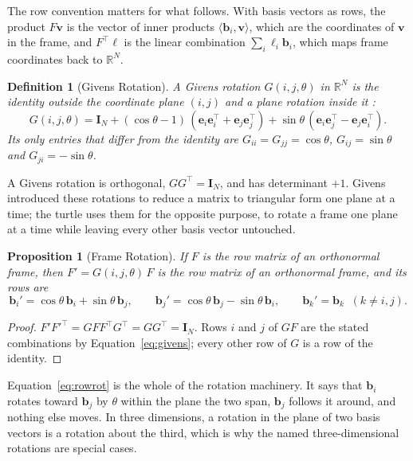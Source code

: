 \documentclass[11pt,letterpaper]{article}
\newtheorem{definition}{Definition}[section]
\newtheorem{proposition}{Proposition}[section]
\newcommand{\R}{\mathbb{R}}
\newcommand{\basis}{\mathbf{b}}
\newcommand{\std}{\mathbf{e}}
\newcommand{\eye}{\mathbf{I}}
\begin{document}
The row convention matters for what follows. With basis vectors as
rows, the product $F \mathbf{v}$ is the vector of inner products
$\langle \basis_i, \mathbf{v} \rangle$, which are the coordinates of
$\mathbf{v}$ in the frame, and $F^\top \bm{\ell}$ is the linear
combination $\sum_i \ell_i \basis_i$, which maps frame coordinates back
to $\R^N$.

\begin{definition}[Givens Rotation]
\label{def:givens}
A \emph{Givens rotation} $G(i, j, \theta)$ in $\R^N$ is the identity
outside the coordinate plane $(i, j)$ and a plane rotation inside it
\citep{givens1958computation, golub2013matrix}:
\begin{equation}
  G(i, j, \theta)
  = \eye_N
  + (\cos\theta - 1)\,(\std_i\std_i^\top + \std_j\std_j^\top)
  + \sin\theta\,(\std_i\std_j^\top - \std_j\std_i^\top).
  \label{eq:givens}
\end{equation}
Its only entries that differ from the identity are
$G_{ii} = G_{jj} = \cos\theta$, $G_{ij} = \sin\theta$ and
$G_{ji} = -\sin\theta$.
\end{definition}

A Givens rotation is orthogonal, $G G^\top = \eye_N$, and has
determinant $+1$. Givens introduced these rotations to reduce a matrix
to triangular form one plane at a time; the turtle uses them for the
opposite purpose, to rotate a frame one plane at a time while leaving
every other basis vector untouched.

\begin{proposition}[Frame Rotation]
\label{prop:rotation}
If $F$ is the row matrix of an orthonormal frame, then $F' = G(i, j,
\theta)\,F$ is the row matrix of an orthonormal frame, and its rows are
\begin{equation}
  \basis_i' = \cos\theta\,\basis_i + \sin\theta\,\basis_j, \qquad
  \basis_j' = \cos\theta\,\basis_j - \sin\theta\,\basis_i, \qquad
  \basis_k' = \basis_k \;\; (k \neq i, j).
  \label{eq:rowrot}
\end{equation}
\end{proposition}

\begin{proof}
$F' F'^\top = G F F^\top G^\top = G G^\top = \eye_N$. Rows $i$ and $j$ of
$GF$ are the stated combinations by Equation~\eqref{eq:givens}; every
other row of $G$ is a row of the identity.
\end{proof}

Equation~\eqref{eq:rowrot} is the whole of the rotation machinery. It
says that $\basis_i$ rotates toward $\basis_j$ by $\theta$ within the
plane the two span, $\basis_j$ follows it around, and nothing else
moves. In three dimensions, a rotation in the plane of two basis
vectors is a rotation about the third, which is why the named
three-dimensional rotations are special cases.
\end{document}

